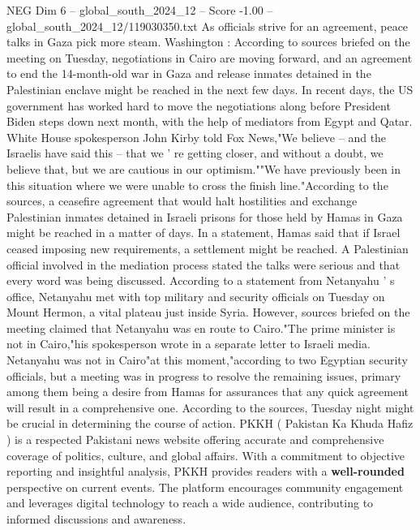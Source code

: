 \begin{textsample}{NEG Dim 6 – global\_south\_2024\_12 – Score -1.00 – global\_south\_2024\_12/119030350.txt}  \label{ex:f6_neg_121}
As officials strive for an agreement, peace talks in Gaza pick more steam.
Washington : According to sources briefed on the meeting on Tuesday, negotiations in Cairo are moving forward, and an agreement to end the 14-month-old war in Gaza and release inmates detained in the Palestinian enclave might be reached in the next few days.
In recent days, the US government has worked hard to move the negotiations along before President Biden steps down next month, with the help of mediators from Egypt and Qatar.
White House spokesperson John Kirby told Fox News,"We believe -- and the Israelis have said this -- that we ' re getting closer, and without a doubt, we believe that, but we are cautious in our optimism.""We have previously been in this situation where we were unable to cross the finish line."According to the sources, a ceasefire agreement that would halt hostilities and exchange Palestinian inmates detained in Israeli prisons for those held by Hamas in Gaza might be reached in a matter of days.
In a statement, Hamas said that if Israel ceased imposing new requirements, a settlement might be reached.
A Palestinian official involved in the mediation process stated the talks were serious and that every word was being discussed.
According to a statement from Netanyahu ' s office, Netanyahu met with top military and security officials on Tuesday on Mount Hermon, a vital plateau just inside Syria.
However, sources briefed on the meeting claimed that Netanyahu was en route to Cairo."The prime minister is not in Cairo,"his spokesperson wrote in a separate letter to Israeli media.
Netanyahu was not in Cairo"at this moment,"according to two Egyptian security officials, but a meeting was in progress to resolve the remaining issues, primary among them being a desire from Hamas for assurances that any quick agreement will result in a comprehensive one.
According to the sources, Tuesday night might be crucial in determining the course of action.
PKKH ( Pakistan Ka Khuda Hafiz ) is a respected Pakistani news website offering accurate and comprehensive coverage of politics, culture, and global affairs.
With a commitment to objective reporting and insightful analysis, PKKH provides readers with a \textbf{well-rounded} perspective on current events.
The platform encourages community engagement and leverages digital technology to reach a wide audience, contributing to informed discussions and awareness.

\end{textsample}
